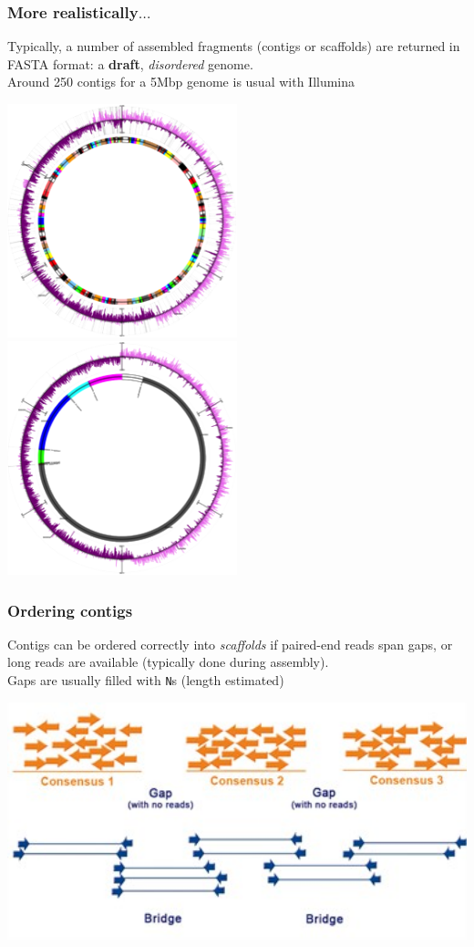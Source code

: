 \begin{frame}
  \frametitle{More realistically$\ldots$}
  Typically, a number of assembled fragments (contigs or scaffolds) are returned in FASTA format: a \textbf{draft}, \textit{disordered} genome.\\
  Around 250 contigs for a 5Mbp genome is usual with Illumina\\
  \begin{center}
    \includegraphics[width=0.5\textwidth]{images/circle_1}
    \includegraphics[width=0.5\textwidth]{images/circle_3}
  \end{center}    
\end{frame}

\begin{frame}
  \frametitle{Ordering contigs}
  Contigs can be ordered correctly into \textit{scaffolds} if paired-end reads span gaps, or long reads are available (typically done during assembly).\\
  Gaps are usually filled with \texttt{N}s (length estimated)
  \begin{center}
    \includegraphics[width=1\textwidth]{images/contig_order_pe}
  \end{center}    
\end{frame}

